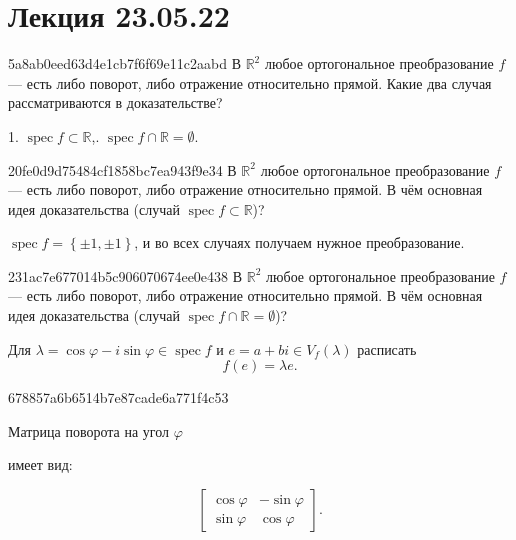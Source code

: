 \section{Лекция 23.05.22}
\begin{note}{5a8ab0eed63d4e1cb7f6f69e11c2aabd}
    В \({ \mathbb R^2 }\) любое ортогональное преобразование \({ f }\) --- есть либо поворот, либо отражение относительно прямой.
    Какие  два случая рассматриваются в доказательстве?

    \begin{cloze}{1}
        1. \({ \operatorname{spec} f \subset  \mathbb R }\),. \({ \operatorname{spec} f \cap \mathbb R = \emptyset }\).
    \end{cloze}
\end{note}

\begin{note}{20fe0d9d75484cf1858bc7ea943f9e34}
    В \({ \mathbb R^2 }\) любое ортогональное преобразование \({ f }\) --- есть либо поворот, либо отражение относительно прямой.
    В чём основная идея доказательства (случай \({ \operatorname{spec} f \subset \mathbb R }\))?

    \begin{cloze}{1}
        \({ \operatorname{spec} f = \left\{ \pm 1, \pm 1 \right\} }\), и во всех случаях получаем нужное преобразование.
    \end{cloze}
\end{note}

\begin{note}{231ac7e677014b5c906070674ee0e438}
    В \({ \mathbb R^2 }\) любое ортогональное преобразование \({ f }\) --- есть либо поворот, либо отражение относительно прямой.
    В чём основная идея доказательства (случай \({ \operatorname{spec} f \cap \mathbb R = \emptyset }\))?

    \begin{cloze}{1}
        Для \({ \lambda = \cos \varphi - i \sin \varphi \in \operatorname{spec} f }\) и \({ e = a + bi \in V_f(\lambda) }\) расписать
        \[
            f(e) = \lambda e.
        \]
    \end{cloze}
\end{note}

\begin{note}{678857a6b6514b7e87cade6a771f4c53}
    \begin{icloze}{2}Матрица поворота на угол \({ \varphi }\)\end{icloze} имеет вид:
    \begin{icloze}{1}
        \[
            \begin{bmatrix}
                \cos \varphi & -\sin \varphi \\
                \sin \varphi & \cos \varphi
            \end{bmatrix}.
        \]
    \end{icloze}
\end{note}

